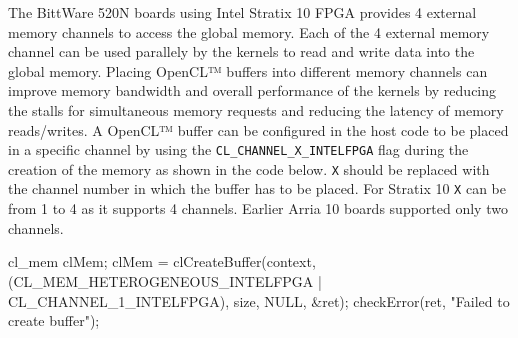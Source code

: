 The BittWare 520N boards using Intel Stratix 10 FPGA provides 4 external memory channels
to access the global memory. Each of the
4 external memory channel can be used parallely by the kernels to read and write data
into the global memory. Placing OpenCL™ buffers into different memory channels can
improve memory bandwidth and overall performance of the kernels by reducing the stalls
for simultaneous memory requests and reducing the latency of memory reads/writes.
A OpenCL™ buffer can be configured in the host code to be placed in a specific channel
by using the \texttt{CL\_CHANNEL\_X\_INTELFPGA} flag during the creation of the memory
as shown in the code below. \texttt{X} should be replaced with the channel number in which
the buffer has to be placed. For Stratix 10 \texttt{X} can be from 1 to 4 as it supports 4 channels.
Earlier Arria 10 boards supported only two channels.
\begin{CppCode}
cl_mem clMem;
clMem = clCreateBuffer(context, (CL_MEM_HETEROGENEOUS_INTELFPGA | CL_CHANNEL_1_INTELFPGA), size, NULL, &ret);
checkError(ret, "Failed to create buffer");
\end{CppCode}

